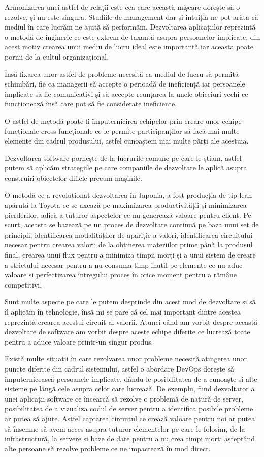 Armonizarea unei astfel de relații este cea care această mișcare dorește
să o rezolve, și nu este singura. Studiile de management dar și intuiția
ne pot arăta că mediul în care lucrăm ne ajută să performăm. Dezvoltarea
aplicațiilor reprezintă o metodă de inginerie ce este extrem de taxantă asupra
persoanelor implicate, din acest motiv crearea unui mediu de lucru ideal
este importantă iar aceasta poate pornii de la cultul organizațional.

Însă fixarea unor astfel de probleme necesită ca mediul de lucru să
permită schimbări, fie ca managerii să accepte o perioadă de ineficiență
iar persoanele implicate să fie comunicativi și să accepte reunțarea
la unele obiceiuri vechi ce funcționează însă care pot să fie considerate ineficiente.

O astfel de metodă poate fi împuternicirea echipelor prin creare unor echipe
funcționale cross funcționale ce le permite participanților să facă mai multe
elemente din cadrul produsului, astfel cunoaștem mai multe părți ale acestuia.

Dezvoltarea software pornește de la lucrurile comune pe care le știam, astfel
putem să aplicăm strategiile pe care companiile de dezvoltare le aplică asupra
construiri obiectelor dificle precum mașinile.

O metodă ce a revoluționat dezvoltarea în Japonia, a fost producția de tip lean
apărută la Toyota ce se axează pe maximizarea productivității și minimizarea
pierderilor, adică a tuturor aspectelor ce nu generează valoare
pentru client. Pe scurt, aceasta se bazează pe un proces de
dezvoltare continuă pe baza unui set de principii, identificarea modalităților
de apariție a valori, identificarea circuitului necesar pentru crearea valorii
de la obținerea materiilor prime până la produsul final, crearea unui
flux pentru a minimiza timpii morți și a unui sistem de creare a strictului
necesar pentru a nu consuma timp inutil pe elemente ce nu aduc valoare
și perfectizarea întregului proces în orice moment pentru a rămâne competitivi.

Sunt multe aspecte pe care le putem desprinde din acest mod de dezvoltare
și să îl aplicăm în tehnologie, însă mi se pare că cel mai important dintre
acestea reprezintă crearea acestui circuit al valorii. Atunci când am vorbit despre
această dezvoltare de software am vorbit despre aceste echipe diferite
ce lucrează toate pentru a aduce valoare printr-un singur produs.

Există multe situații în care rezolvarea unor probleme necesită atingerea
unor puncte diferite din cadrul sistemului, astfel o abordare DevOps dorește
să împuternicească persoanele implicate, dându-le posibilitatea de a cunoaște
și alte sisteme pe lângă cele asupra celor care lucrează. De exemplu, fiind
dezvoltator a unei aplicații software ce încearcă să rezolve o problemă
de natură de server, posibilitatea de a vizualiza codul de server
pentru a identifica posibile probleme ar putea să ajute. Astfel captarea
circuitul ce crează valoare pentru noi ar putea să însemne să avem acces
asupra tuturor elementelor pe care le folosim, de la infrastructură, la servere și baze
de date pentru a nu crea timpi morți așteptând alte persoane să rezolve probleme
ce ne impactează în mod direct.

